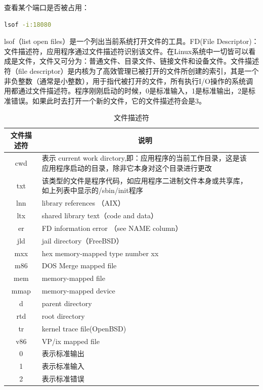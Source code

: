 \documentclass[12pt]{book}
\numberwithin{dummy}{section}
\theoremstyle{ocrenumbox}
\theoremstyle{blacknumex}
\theoremstyle{blacknumbox}
\theoremstyle{ocrenum}
\begin{document}
查看某个端口是否被占用：

\begin{lstlisting}[language=Bash]
lsof -i:18080
\end{lstlisting}

lsof（list open files）是一个列出当前系统打开文件的工具。FD(File Descriptor)：文件描述符，应用程序通过文件描述符识别该文件。在Linux系统中一切皆可以看成是文件，文件又可分为：普通文件、目录文件、链接文件和设备文件。文件描述符（file descriptor）是内核为了高效管理已被打开的文件所创建的索引，其是一个非负整数（通常是小整数），用于指代被打开的文件，所有执行I/O操作的系统调用都通过文件描述符。程序刚刚启动的时候，0是标准输入，1是标准输出，2是标准错误。如果此时去打开一个新的文件，它的文件描述符会是3。

\begin{table}
	\caption{文件描述符}
	\label{table:filedescriptor}
	\bigskip
	\begin{tabular}{cp{12cm}c}
		\hline
		\multirow{1}{*}{文件描述符}
		& \multicolumn{1}{c}{说明}  \\
		\hline			
		cwd & 表示 current  work dirctory,即：应用程序的当前工作目录，这是该应用程序启动的目录，除非它本身对这个目录进行更改 \\
		txt & 该类型的文件是程序代码，如应用程序二进制文件本身或共享库，如上列表中显示的/sbin/init程序 \\
		lnn & library references （AIX） \\
		ltx & shared  library text（code and  data） \\
		er & FD  information  error （see  NAME  column） \\
		jld & jail  directory（FreeBSD） \\
		mxx & hex  memory-mapped  type number  xx\\
		m86 & DOS  Merge  mapped  file\\
		mem & memory-mapped  file\\
		mmap & memory-mapped device\\
		d & parent  directory\\
		rtd & root  directory\\
		tr & kernel  trace file(OpenBSD)\\
		v86 & VP/ix  mapped  file\\
		0 & 表示标准输出\\
		1 & 表示标准输入\\
		2 & 表示标准错误\\	
		\hline
	\end{tabular}
\end{table}
\end{document}
